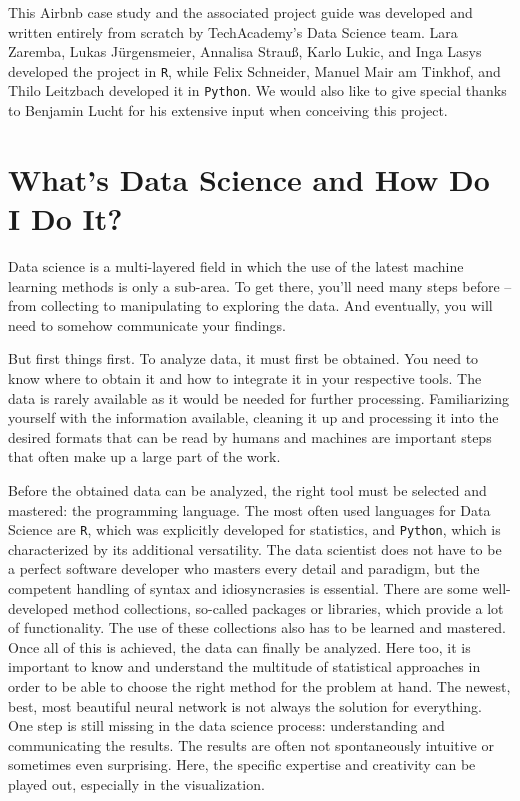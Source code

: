 \documentclass[
  11pt,
]{article}
\begin{document}
This Airbnb case study and the associated project guide was developed and written entirely from scratch by TechAcademy's Data Science team. Lara Zaremba, Lukas Jürgensmeier, Annalisa Strauß, Karlo Lukic, and Inga Lasys developed the project in \texttt{R}, while Felix Schneider, Manuel Mair am Tinkhof, and Thilo Leitzbach developed it in \texttt{Python}. We would also like to give special thanks to Benjamin Lucht for his extensive input when conceiving this project.

\hypertarget{whats-data-science-and-how-do-i-do-it}{%
\section{What's Data Science and How Do I Do It?}\label{whats-data-science-and-how-do-i-do-it}}

Data science is a multi-layered field in which the use of the latest machine learning methods is only a sub-area. To get there, you'll need many steps before -- from collecting to manipulating to exploring the data. And eventually, you will need to somehow communicate your findings.

But first things first. To analyze data, it must first be obtained. You need to know where to obtain it and how to integrate it in your respective tools. The data is rarely available as it would be needed for further processing. Familiarizing yourself with the information available, cleaning it up and processing it into the desired formats that can be read by humans and machines are important steps that often make up a large part of the work.

Before the obtained data can be analyzed, the right tool must be selected and mastered: the programming language. The most often used languages for Data Science are \texttt{R}, which was explicitly developed for statistics, and \texttt{Python}, which is characterized by its additional versatility. The data scientist does not have to be a perfect software developer who masters every detail and paradigm, but the competent handling of syntax and idiosyncrasies is essential.
There are some well-developed method collections, so-called packages or libraries, which provide a lot of functionality. The use of these collections also has to be learned and mastered.
Once all of this is achieved, the data can finally be analyzed. Here too, it is important to know and understand the multitude of statistical approaches in order to be able to choose the right method for the problem at hand. The newest, best, most beautiful neural network is not always the solution for everything.\\
One step is still missing in the data science process: understanding and communicating the results. The results are often not spontaneously intuitive or sometimes even surprising. Here, the specific expertise and creativity can be played out, especially in the visualization.
\end{document}
